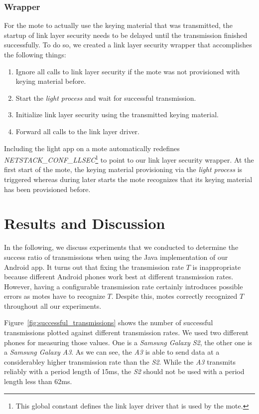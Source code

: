 \documentclass{sig-alternate} %
\begin{document}
\subsubsection{Wrapper}
\label{ssub:contiki_driver_wrapper}

For the mote to actually use the keying material that was transmitted, the startup of link layer security needs to be delayed until the transmission finished successfully.
To do so, we created a link layer security wrapper that accomplishes the following things:

\begin{enumerate}
	\item Ignore all calls to link layer security if the mote was not provisioned with keying material before.
	\item Start the \textit{light process} and wait for successful transmission.
	\item Initialize link layer security using the transmitted keying material.
	\item Forward all calls to the link layer driver.
\end{enumerate}

Including the light app on a mote automatically redefines \textit{NETSTACK\_CONF\_LLSEC}\footnote{This global constant defines the link layer driver that is used by the mote.} to point to our link layer security wrapper.
At the first start of the mote, the keying material provisioning via the \textit{light process} is triggered whereas during later starts the mote recognizes that its keying material has been provisioned before.


\section{Results and Discussion}
\label{sec:results_and_discussion}

In the following, we discuss experiments that we conducted to determine the success ratio of transmissions when using the Java implementation of our Android app. 
It turns out that fixing the transmission rate $T$ is inappropriate because different Android phones work best at different transmission rates. 
However, having a configurable transmission rate certainly introduces possible errors as motes have to recognize $T$. 
Despite this, motes correctly recognized $T$ throughout all our experiments.

Figure~\ref{fig:successful_transmissions} shows the number of successful transmissions plotted against different transmission rates.
We used two different phones for measuring those values.
One is a \textit{Samsung Galaxy S2}, the other one is a \textit{Samsung Galaxy A3}.
As we can see, the \textit{A3} is able to send data at a considerabley higher transmission rate than the \textit{S2}.
While the \textit{A3} transmits reliably with a period length of 15ms, the \textit{S2} should not be used with a period length less than 62ms.
\end{document}
